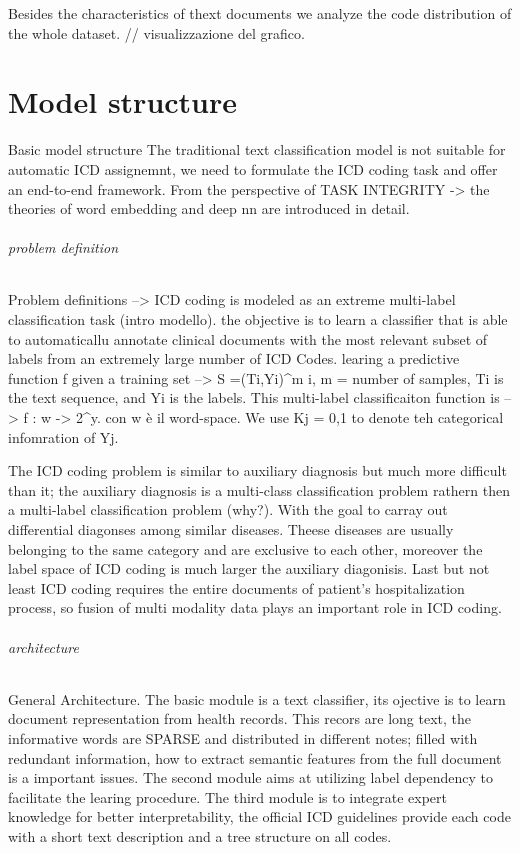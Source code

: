 Besides the characteristics of thext documents we analyze the code distribution of the whole dataset. 
// visualizzazione del grafico. 

\part{Model structure}

Basic model structure 
The traditional text classification model is not suitable for automatic ICD assignemnt, we need to 
formulate the ICD coding task and offer an end-to-end framework. 
From the perspective of TASK INTEGRITY -> the theories of word embedding and deep nn are introduced in detail. 
\paragraph{problem definition}

Problem definitions --> ICD coding is modeled as an extreme multi-label classification task (intro modello). 
the objective is to learn a classifier that is able to automaticallu annotate clinical documents with 
the most relevant subset of labels from an extremely large number of ICD Codes. 
learing a predictive function f given a training set --> S ={(Ti,Yi)}^m i, m = number of samples, Ti is the 
text sequence, and Yi is the labels. 
This multi-label classificaiton function is --> f : w -> 2^y. con w è il word-space. 
We use Kj = {0,1} to denote teh categorical infomration of Yj. 

The ICD coding problem is similar to auxiliary diagnosis but much more difficult than it; the auxiliary diagnosis 
is a multi-class classification problem rathern then a multi-label classification problem (why?). 
With the goal to carray out differential diagonses among similar diseases. 
Theese diseases are usually belonging to the same category and are exclusive to each other, moreover the label 
space of ICD coding is much larger the auxiliary diagonisis. 
Last but not least ICD coding requires the entire documents of patient's hospitalization process, so fusion of multi 
modality data plays an important role in ICD coding.

\paragraph{architecture}
General Architecture. 
The basic module is a text classifier, its ojective is to learn document representation from health records. 
This recors are long text, the informative words are SPARSE and distributed in different notes; filled with 
redundant information, how to extract semantic features from the full document is a important issues. 
The second module aims at utilizing label dependency to facilitate the learing procedure. 
The third module is to integrate expert knowledge for better interpretability, the official ICD guidelines 
provide each code with a short text description and a tree structure on all codes. 


